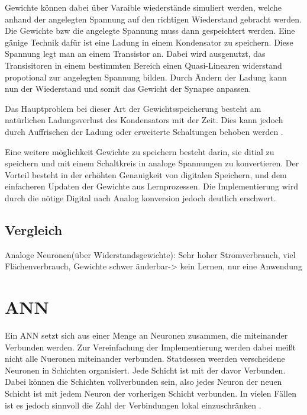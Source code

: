 \documentclass[conference]{IEEEtran}
\begin{document}
    Gewichte können dabei über Varaible wiederstände simuliert werden, welche anhand der angelegten Spannung auf den richtigen Wiederstand gebracht werden.
    Die Gewichte bzw die angelegte Spannung muss dann gespeichtert werden.
    Eine gänige Technik dafür ist eine Ladung in einem Kondensator zu speichern.
    Diese Spannung legt man an einem Transistor an.
    Dabei wird ausgenutzt, das Transisitoren in einem bestimmten Bereich einen Quasi-Linearen widerstand propotional zur angelegten Spannung bilden.
    Durch Ändern der Ladung kann nun der Wiederstand und somit das Gewicht der Synapse anpassen.

    Das Hauptproblem bei dieser Art der Gewichtsspeicherung besteht am natürlichen Ladungsverlust des Kondensators mit der Zeit.
    Dies kann jedoch durch Auffrischen der Ladung oder erweiterte Schaltungen behoben werden \cite{reed1989multiple} .


    Eine weitere möglichkeit Gewichte zu speichern besteht darin, sie ditial zu speichern und mit einem Schaltkreis in analoge Spannungen zu konvertieren.
    Der Vorteil besteht in der erhöhten Genauigkeit von digitalen Speichern, und dem einfacheren Updaten der Gewichte aus Lernprozessen.
    Die Implementierung wird durch die nötige Digital nach Analog konversion jedoch deutlich erschwert.



    \subsection{Vergleich}

    Analoge Neuronen(über Widerstandsgewichte): Sehr hoher Stromverbrauch, viel Flächenverbrauch, Gewichte schwer änderbar-> kein Lernen, nur eine Anwendung

    \section{ANN}

    Ein ANN setzt sich aus einer Menge an Neuronen zusammen, die miteinander Verbunden werden.
    Zur Vereinfachung der Implementierung werden dabei meißt nicht alle Nueronen miteinander verbunden.
    Statdessen weerden verscheidene Neuronen in Schichten organisiert.
    Jede Schicht ist mit der davor Verbunden.
    Dabei können die Schichten vollverbunden sein, also jedes Neuron der neuen Schicht ist mit jedem Neuron der vorherigen Schicht verbunden.
    In vielen Fällen ist es jedoch sinnvoll die Zahl der Verbindungen lokal einzuschränken \cite{boser1991analog} .
\end{document}
